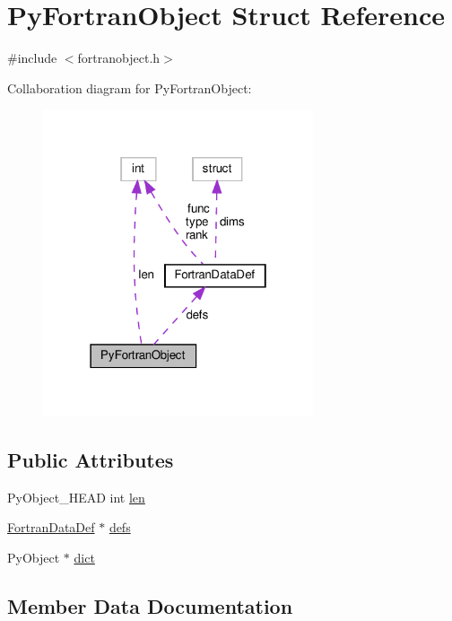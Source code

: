 \hypertarget{structPyFortranObject}{}\section{Py\+Fortran\+Object Struct Reference}
\label{structPyFortranObject}


{\ttfamily \#include $<$fortranobject.\+h$>$}



Collaboration diagram for Py\+Fortran\+Object\+:
\nopagebreak
\begin{figure}[H]
\begin{center}
\leavevmode
\includegraphics[width=226pt]{structPyFortranObject__coll__graph}
\end{center}
\end{figure}
\subsection*{Public Attributes}
\begin{DoxyCompactItemize}
\item 
Py\+Object\+\_\+\+H\+E\+AD int \hyperlink{structPyFortranObject_aa31e81b5bef7f570614b69f5deb05032}{len}
\item 
\hyperlink{structFortranDataDef}{Fortran\+Data\+Def} $\ast$ \hyperlink{structPyFortranObject_a39f1d324e82b052b8d66d9e5e28f97d5}{defs}
\item 
Py\+Object $\ast$ \hyperlink{structPyFortranObject_a8e589a13bed1070f68f8094e91a54bec}{dict}
\end{DoxyCompactItemize}


\subsection{Member Data Documentation}
\mbox{\label{structPyFortranObject_a39f1d324e82b052b8d66d9e5e28f97d5}} 
